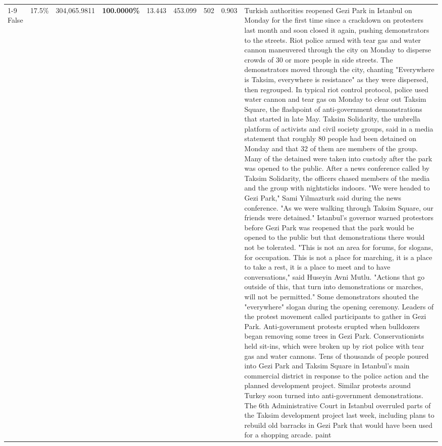 \begin{table}[H]
\begin{tabular}{lllrlllll}
\cline{1-9}
False & 17.5\% & \color{red} 304,065.9811 & \bfseries \color{red} 100.0000\% & 13.443 & 453.099 & 502 & 0.903 & Turkish authorities reopened Gezi Park in Istanbul on Monday for the first time since a crackdown on protesters last month and soon closed it again, pushing demonstrators to the streets. Riot police armed with tear gas and water cannon maneuvered through the city on Monday to disperse crowds of 30 or more people in side streets. The demonstrators moved through the city, chanting "Everywhere is Taksim, everywhere is resistance" as they were dispersed, then regrouped. In typical riot control protocol, police used water cannon and tear gas on Monday to clear out Taksim Square, the flashpoint of anti-government demonstrations that started in late May. Taksim Solidarity, the umbrella platform of activists and civil society groups, said in a media statement that roughly 80 people had been detained on Monday and that 32 of them are members of the group. Many of the detained were taken into custody after the park was opened to the public. After a news conference called by Taksim Solidarity, the officers chased members of the media and the group with nightsticks indoors. "We were headed to Gezi Park," Sami Yilmazturk said during the news conference. "As we were walking through Taksim Square, our friends were detained." Istanbul's governor warned protestors before Gezi Park was reopened that the park would be opened to the public but that demonstrations there would not be tolerated. "This is not an area for forums, for slogans, for occupation. This is not a place for marching, it is a place to take a rest, it is a place to meet and to have conversations," said Huseyin Avni Mutlu. "Actions that go outside of this, that turn into demonstrations or marches, will not be permitted." Some demonstrators shouted the "everywhere" slogan during the opening ceremony. Leaders of the protest movement called participants to gather in Gezi Park. Anti-government protests erupted when bulldozers began removing some trees in Gezi Park. Conservationists held sit-ins, which were broken up by riot police with tear gas and water cannons. Tens of thousands of people poured into Gezi Park and Taksim Square in Istanbul's main commercial district in response to the police action and the planned development project. Similar protests around Turkey soon turned into anti-government demonstrations. The 6th Administrative Court in Istanbul overruled parts of the Taksim development project last week, including plans to rebuild old barracks in Gezi Park that would have been used for a shopping arcade. paint \\

\end{tabular}
\end{table}
